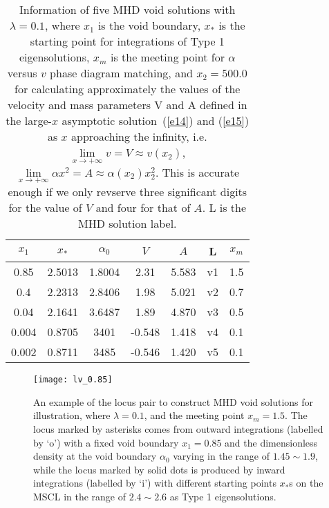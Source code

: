 \documentclass[fleqn,usenatbib]{mnras}
\begin{document}
\begin{table}
  \centering
  \caption{Information of five MHD void solutions with $\lambda=0.1$, where $x_{1}$ is the void boundary, $x_{*}$ is the starting point for integrations of Type 1 eigensolutions, $x_{m}$ is the meeting point for $\alpha$ versus $v$ phase diagram matching, and $x_{2}=500.0$ for calculating approximately the values of the velocity and mass parameters V and A defined in the large-$x$ asymptotic solution~(\ref{e14}) and (\ref{e15}) as $x$ approaching the infinity, i.e. $\lim\limits_{x\rightarrow +\infty} v=V\approx v(x_{2})$, $\lim\limits_{x\rightarrow +\infty}\alpha x^{2}=A\approx \alpha(x_{2})x_{2}^{2}$. This is accurate enough if we only revserve three significant digits for the value of $V$ and four for that of $A$. L is the MHD solution label.}
    \begin{tabular}{ccccccc}
    \hline
    $x_{1}$ & $x_{*}$ & $\alpha_{0}$ & $V$ & $A$ & L & $x_{m}$\\
    \hline
    0.85 & 2.5013 & 1.8004 & 2.31 & 5.583 & v1 & 1.5\\
    0.4 & 2.2313 & 2.8406 & 1.98 & 5.021 & v2 & 0.7\\
    0.04 & 2.1641 & 3.6487 & 1.89 & 4.870 & v3 & 0.5\\
    0.004 & 0.8705 & 3401 & -0.548 & 1.418 & v4 & 0.1\\
    0.002 & 0.8711 & 3485 & -0.546 & 1.420 & v5 & 0.1\\
    \hline
    \end{tabular}
    \label{t1}
\end{table}    

\begin{figure}
\centering
\texttt{[image: lv\_0.85]}
\caption{
An example of the locus pair to construct MHD void solutions for illustration, where $\lambda=0.1$, and the meeting point $x_{m}=1.5$. The locus marked by asterisks comes from outward integrations (labelled by `o') with a fixed void boundary $x_{1}=0.85$ and the dimensionless density at the void boundary $\alpha_{0}$ varying in the range of $1.45\sim 1.9$, while the locus marked by solid dots is produced by inward integrations (labelled by `i') with different starting points $x_{*}$s on the MSCL in the range of $2.4\sim 2.6$ as Type 1 eigensolutions.
 }
\label{1}
\end{figure}
\end{document}
